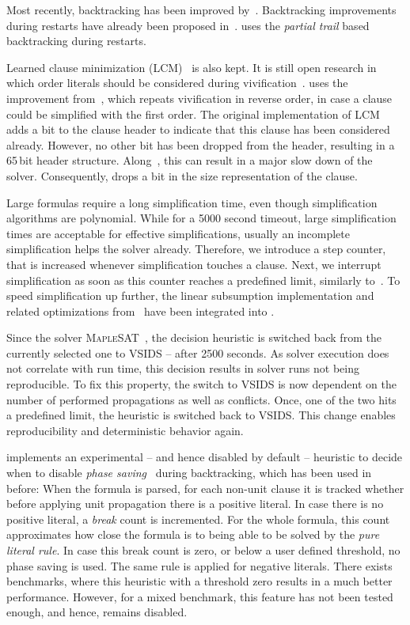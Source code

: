 \documentclass[conference]{IEEEtran}
\begin{document}
Most recently, backtracking has been improved by~\cite{10.1007/978-3-319-94144-8_7}. Backtracking improvements during restarts have already been proposed in~\cite{10.1007/978-3-642-21581-0_18}.
\mergesat uses the \emph{partial trail} based backtracking during restarts.

Learned clause minimization (LCM)~\cite{ijcai2017-98} is also kept. It is still open research in which order literals should be considered during vivification~\cite{DBLP:conf/ecai/PietteHS08}.
\mergesat uses the improvement from~\cite{riss71}, which repeats vivification in reverse order, in case a clause could be simplified with the first order.
The original implementation of LCM adds a bit to the clause header to indicate that this clause has been considered already.
However, no other bit has been dropped from the header, resulting in a 65\,bit header structure.
Along~\cite{HolldoblerMS:2010}, this can result in a major slow down of the solver.
Consequently, \mergesat drops a bit in the size representation of the clause.

Large formulas require a long simplification time, even though simplification algorithms are polynomial.
While for a 5000 second timeout, large simplification times are acceptable for effective simplifications, usually an incomplete simplification helps the solver already.
Therefore, we introduce a step counter, that is increased whenever simplification touches a clause.
Next, we interrupt simplification as soon as this counter reaches a predefined limit, similarly to~\cite{precosat}.
To speed simplification up further, the linear subsumption implementation and related optimizations from~\cite{POS-18:Tuning_Parallel_SAT_Solvers} have been integrated into \mergesat.

Since the solver \textsc{MapleSAT}~\cite{MapleSAT}, the decision heuristic is switched back from the currently selected one to VSIDS -- after 2500 seconds.
As solver execution does not correlate with run time, this decision results in solver runs not being reproducible.
To fix this property, the switch to VSIDS is now dependent on the number of performed propagations as well as conflicts.
Once, one of the two hits a predefined limit, the heuristic is switched back to VSIDS.
This change enables reproducibility and deterministic behavior again.

\mergesat implements an experimental -- and hence disabled by default -- heuristic to decide when to disable \emph{phase saving}~\cite{Pipatsrisawat:2007:LCC:1768142.1768170} during backtracking, which has been used in \riss~\cite{riss71} before:
When the formula is parsed, for each non-unit clause it is tracked whether before applying unit propagation there is a positive literal.
In case there is no positive literal, a \emph{break} count is incremented.
For the whole formula, this count approximates how close the formula is to being able to be solved by the \emph{pure literal rule}.
In case this break count is zero, or below a user defined threshold, no phase saving is used.
The same rule is applied for negative literals.
There exists benchmarks, where this heuristic with a threshold zero results in a much better performance.
However, for a mixed benchmark, this feature has not been tested enough, and hence, remains disabled.
\end{document}
